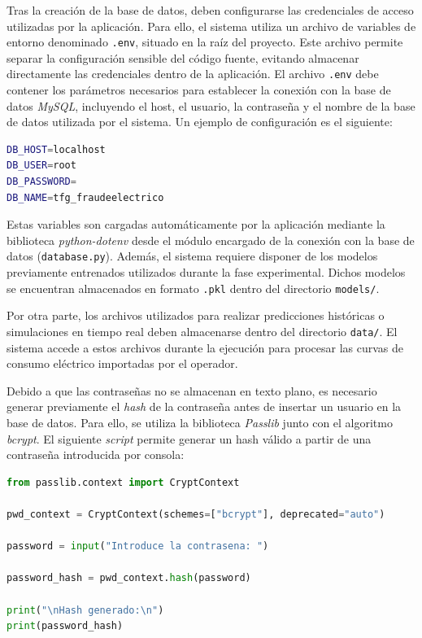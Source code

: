 \documentclass[12pt,a4paper]{report}
\begin{document}
Tras la creación de la base de datos, deben configurarse las credenciales de acceso utilizadas por la aplicación. Para ello, el sistema utiliza un archivo de variables de entorno denominado \texttt{.env}, situado en la raíz del proyecto. Este archivo permite separar la configuración sensible del código fuente, evitando almacenar directamente las credenciales dentro de la aplicación. El archivo \texttt{.env} debe contener los parámetros necesarios para establecer la conexión con la base de datos \emph{MySQL}, incluyendo el host, el usuario, la contraseña y el nombre de la base de datos utilizada por el sistema. Un ejemplo de configuración es el siguiente:

\begin{lstlisting}[language=bash, caption={Configuración de variables de entorno}]
DB_HOST=localhost
DB_USER=root
DB_PASSWORD=
DB_NAME=tfg_fraudeelectrico
\end{lstlisting}

Estas variables son cargadas automáticamente por la aplicación mediante la biblioteca \emph{python-dotenv} desde el módulo encargado de la conexión con la base de datos (\texttt{database.py}). Además, el sistema requiere disponer de los modelos previamente entrenados utilizados durante la fase experimental. Dichos modelos se encuentran almacenados en formato \texttt{.pkl} dentro del directorio \texttt{models/}.

Por otra parte, los archivos utilizados para realizar predicciones históricas o simulaciones en tiempo real deben almacenarse dentro del directorio \texttt{data/}. El sistema accede a estos archivos durante la ejecución para procesar las curvas de consumo eléctrico importadas por el operador.

Debido a que las contraseñas no se almacenan en texto plano, es necesario generar previamente el \emph{hash} de la contraseña antes de insertar un usuario en la base de datos. Para ello, se utiliza la biblioteca \emph{Passlib} junto con el algoritmo \emph{bcrypt}. El siguiente \emph{script} permite generar un hash válido a partir de una contraseña introducida por consola:

\begin{lstlisting}[language=Python, caption={Generación de hash para contraseñas}]
from passlib.context import CryptContext

pwd_context = CryptContext(schemes=["bcrypt"], deprecated="auto")

password = input("Introduce la contrasena: ")

password_hash = pwd_context.hash(password)

print("\nHash generado:\n")
print(password_hash)
\end{lstlisting}
\end{document}
